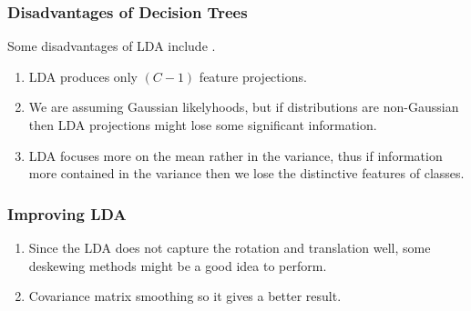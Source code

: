 \subsubsection{Disadvantages of Decision Trees}

Some disadvantages of LDA include \cite{notes:dislda}.
%
\begin{enumerate}
	\item LDA produces only $(C-1)$ feature projections. 
	\item We are assuming Gaussian likelyhoods, but if distributions are non-Gaussian then LDA projections might lose some significant information.
	\item LDA focuses more on the mean rather in the variance, thus if information more contained in the variance then we lose the distinctive features of classes.
\end{enumerate}

\subsubsection{Improving LDA}

\begin{enumerate}
	\item Since the LDA does not capture the rotation and translation well, some deskewing methods might be a good idea to perform.
	\item Covariance matrix smoothing so it gives a better result. 
	
\end{enumerate}	